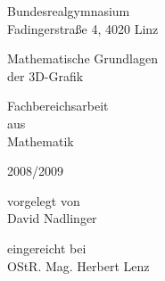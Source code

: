 \begin{titlepage}
  \vspace*{5cm}
  \begin{center}
    \large
    Bundesrealgymnasium\\
    Fadingerstraße 4, 4020 Linz

    \vspace{2cm}

    \Huge
    Mathematische Grundlagen\\
    der 3D-Grafik

    \vspace{1cm}

    \large
    Fachbereichsarbeit\\
    aus\\
    Mathematik

    \vspace{0.5cm}
  
    {\small 2008/2009}
  \end{center}

  \vfill
  {\small vorgelegt von}\vspace{0.1cm}\\
  {\large David Nadlinger}

  \vspace{0.5cm}

  {\small eingereicht bei}\vspace{0.1cm}\\
  {\large OStR. Mag. Herbert Lenz}
  \vspace{-1.5cm}
\end{titlepage}